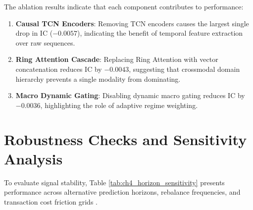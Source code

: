 \begin{table}[htbp]
\centering
\caption{Systematic Component Ablation Study of the TFDMGA Network}
\label{tab:ch4_ablation_study}
\end{table}

The ablation results indicate that each component contributes to performance:
\begin{enumerate}
    \item \textbf{Causal TCN Encoders}: Removing TCN encoders \citep{bai2018empirical} causes the largest single drop in IC ($-0.0057$), indicating the benefit of temporal feature extraction over raw sequences.
    \item \textbf{Ring Attention Cascade}: Replacing Ring Attention \citep{vaswani2017attention} with vector concatenation reduces IC by $-0.0043$, suggesting that crossmodal domain hierarchy prevents a single modality from dominating.
    \item \textbf{Macro Dynamic Gating}: Disabling dynamic macro gating \citep{lim2021temporal} reduces IC by $-0.0036$, highlighting the role of adaptive regime weighting.
\end{enumerate}

\section{Robustness Checks and Sensitivity Analysis}
To evaluate signal stability, Table \ref{tab:ch4_horizon_sensitivity} presents performance across alternative prediction horizons, rebalance frequencies, and transaction cost friction grids \citep{novy2016taxonomy, avramov2023machine}.

